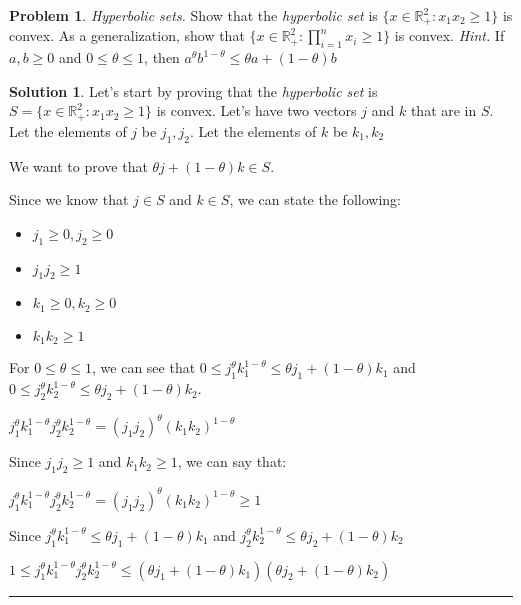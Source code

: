 \documentclass{article}
\theoremstyle{definition}
\newtheorem{problem}{Problem}
\def\fline{\rule{0.75\linewidth}{0.5pt}}
\newcommand{\finishline}{\begin{center}\fline\end{center}}
\newtheorem*{solution*}{Solution}
\newenvironment{solution}{\begin{solution*}}{{\finishline} \end{solution*}}
\begin{document}
\begin{problem}
    \textit{Hyperbolic sets.} Show that the \textit{hyperbolic set} is $\{x \in \mathbb{R}^2_+ : x_1x_2 \geq 1\}$ is convex. As a generalization, show that $\{x \in \mathbb{R}^2_+ : \prod_{i=1}^{n} x_i \geq 1\}$ is convex. \textit{Hint.} If $a, b \geq 0$ and $0 \leq \theta \leq 1$, then $a^{\theta} b^{1 - \theta} \leq \theta a + (1 - \theta) b$

    \begin{solution}

    Let's start by proving that the \textit{hyperbolic set} is $S = \{x \in \mathbb{R}^2_+ : x_1x_2 \geq 1\}$ is convex. \newline 
Let's have two vectors  $j$ and $k$ that are in $S$. Let the elements of $j$ be $j_1, j_2$. Let the elements of $k$ be $k_1, k_2$

We want to prove that $\theta j + (1 - \theta)k \in S$. 

        Since we know that $j \in S$ and $k \in S$, we can state the following:
        \begin{itemize}
            \item $j_1 \geq 0, j_2 \geq 0$
            \item $j_1 j_2 \geq 1$
            \item $k_1 \geq 0, k_2 \geq 0$
            \item $k_1 k_2 \geq 1$
        \end{itemize}

    For $0 \leq \theta \leq 1$, we can see that $0 \leq j_1^{\theta} k_1^{1 - \theta} \leq \theta j_1 + (1 - \theta)k_1$ and $0 \leq j_2^{\theta} k_2^{1 - \theta} \leq \theta j_2 + (1 - \theta)k_2$. 

    $j_1^{\theta} k_1^{1 - \theta} j_2^{\theta} k_2^{1 - \theta} = (j_1 j_2)^{\theta} (k_1 k_2)^{1 - \theta} $

    Since $j_1 j_2 \geq 1$ and $k_1 k_2 \geq 1$, we can say that: \newline 

    $j_1^{\theta} k_1^{1 - \theta} j_2^{\theta} k_2^{1 - \theta} = (j_1 j_2)^{\theta} (k_1 k_2)^{1 - \theta} \geq 1$

    Since $j_1^{\theta} k_1^{1 - \theta} \leq \theta j_1 + (1 - \theta)k_1$ and $j_2^{\theta} k_2^{1 - \theta} \leq \theta j_2 + (1 - \theta)k_2$

    $1 \leq j_1^{\theta} k_1^{1 - \theta} j_2^{\theta} k_2^{1 - \theta} \leq (\theta j_1 + (1 - \theta)k_1) (\theta j_2 + (1 - \theta)k_2)$


\end{solution}
\end{problem}
\end{document}
